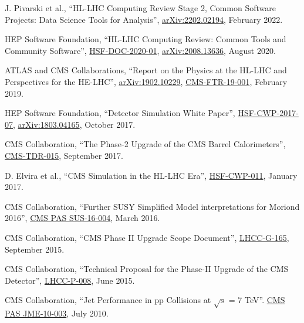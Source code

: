 \begin{description}[leftmargin=12pt,font=\normalfont,labelsep=0em]
\item J. Pivarski et al., ``HL-LHC Computing Review Stage 2, Common Software Projects: Data Science Tools for Analysis'', \href{https://arxiv.org/abs/2202.02194}{arXiv:2202.02194}, February 2022.
\item HEP Software Foundation, ``HL-LHC Computing Review: Common Tools and Community Software'', \href{https://dx.doi.org/10.5281/zenodo.4009114}{HSF-DOC-2020-01}, \href{https://arxiv.org/abs/2008.13636}{arXiv:2008.13636}, August 2020.
\item \begin{sloppypar}ATLAS and CMS Collaborations, ``Report on the Physics at the HL-LHC and Perspectives for the HE-LHC'', \href{http://arxiv.org/abs/arXiv:1902.10229}{arXiv:1902.10229}, \href{https://cds.cern.ch/record/2651134}{CMS-FTR-19-001}, February 2019.\end{sloppypar}
\item HEP Software Foundation, ``Detector Simulation White Paper'', \href{http://hepsoftwarefoundation.org/activities/cwp.html}{HSF-CWP-2017-07}, \href{https://arxiv.org/abs/1803.04165}{arXiv:1803.04165}, October 2017.
\item CMS Collaboration, ``The Phase-2 Upgrade of the CMS Barrel Calorimeters'', \href{https://cds.cern.ch/record/2283187}{CMS-TDR-015}, September 2017.
\item D. Elvira et al., ``CMS Simulation in the HL-LHC Era'', \href{http://hepsoftwarefoundation.org/cwp-whitepapers.html}{HSF-CWP-011}, January 2017.
\item CMS Collaboration, ``Further SUSY Simplified Model interpretations for Moriond 2016'', \href{http://cds.cern.ch/record/2140312}{CMS PAS SUS-16-004}, March 2016.
\item CMS Collaboration, ``CMS Phase II Upgrade Scope Document'', \href{https://cds.cern.ch/record/2055167}{LHCC-G-165}, September 2015.
\item CMS Collaboration, ``Technical Proposal for the Phase-II Upgrade of the CMS Detector'', \href{http://cds.cern.ch/record/2020886}{LHCC-P-008}, June 2015.
\item CMS Collaboration, ``Jet Performance in pp Collisions at $\sqrt{s}$ = 7 TeV''. \href{http://cds.cern.ch/record/1279362}{CMS PAS JME-10-003}, July 2010.
\end{description}

